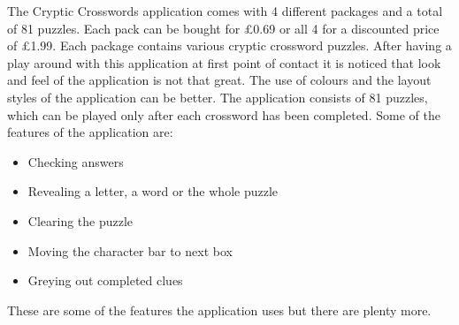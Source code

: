 The Cryptic Crosswords application comes with 4 different packages and a total
of 81 puzzles. Each pack can be bought for \pounds0.69 or all 4 for a discounted
price of \pounds1.99. Each package contains various cryptic crossword puzzles.
After having a play around with this application at first point of contact it is
noticed that look and feel of the application is not that great. The use of
colours and the layout styles of the application can be better. The application
consists of 81 puzzles, which can be played only after each crossword has been
completed. Some of the features of the application are:

\begin{itemize}
  \item Checking answers
  \item Revealing a letter, a word or the whole puzzle
  \item Clearing the puzzle
  \item Moving the character bar to next box
  \item Greying out completed clues
\end{itemize}

These are some of the features the application uses but there are plenty more.
